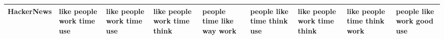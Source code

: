 \documentclass[11pt,a4paper]{article}
\begin{document}
\begin{appendices}
\begin{table*}[htp]
\begin{tiny}
\begin{tabular}{|p{}|p{}|p{}|p{}|p{}|p{}|p{}|p{}|p{}|}
HackerNews & like \newline people \newline work \newline time \newline use & like \newline people \newline work \newline time \newline use & like \newline people \newline work \newline time \newline think & people \newline time \newline like \newline way \newline work & people \newline like \newline time \newline think \newline use & like \newline people \newline work \newline time \newline think & like \newline people \newline time \newline think \newline work & people \newline like \newline work \newline good \newline use\\\hline

\end{tabular}
\end{tiny}
\end{table*}
\end{appendices}
\end{document}
